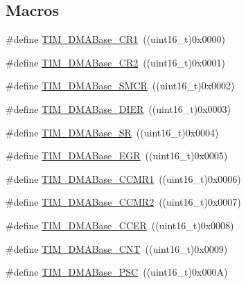 \subsection*{Macros}
\begin{DoxyCompactItemize}
\item 
\#define \hyperlink{group___t_i_m___d_m_a___base__address_ga73bca5b14da2d5026fa3877d0db53740}{T\+I\+M\+\_\+\+D\+M\+A\+Base\+\_\+\+C\+R1}~((uint16\+\_\+t)0x0000)
\item 
\#define \hyperlink{group___t_i_m___d_m_a___base__address_ga50e894f0d2cecc1ff3a3578098c3246e}{T\+I\+M\+\_\+\+D\+M\+A\+Base\+\_\+\+C\+R2}~((uint16\+\_\+t)0x0001)
\item 
\#define \hyperlink{group___t_i_m___d_m_a___base__address_ga748e24ac0675caa55869d6ba506448df}{T\+I\+M\+\_\+\+D\+M\+A\+Base\+\_\+\+S\+M\+CR}~((uint16\+\_\+t)0x0002)
\item 
\#define \hyperlink{group___t_i_m___d_m_a___base__address_gaeddacbbc2adf9705feac250f077d8c93}{T\+I\+M\+\_\+\+D\+M\+A\+Base\+\_\+\+D\+I\+ER}~((uint16\+\_\+t)0x0003)
\item 
\#define \hyperlink{group___t_i_m___d_m_a___base__address_ga5cda07a11a76bbb24a7d5bb680814d31}{T\+I\+M\+\_\+\+D\+M\+A\+Base\+\_\+\+SR}~((uint16\+\_\+t)0x0004)
\item 
\#define \hyperlink{group___t_i_m___d_m_a___base__address_gab5e6f6c3fea100896d13ce317a6ccd8e}{T\+I\+M\+\_\+\+D\+M\+A\+Base\+\_\+\+E\+GR}~((uint16\+\_\+t)0x0005)
\item 
\#define \hyperlink{group___t_i_m___d_m_a___base__address_gaab384496cff3e54d8179fc0db727c7ee}{T\+I\+M\+\_\+\+D\+M\+A\+Base\+\_\+\+C\+C\+M\+R1}~((uint16\+\_\+t)0x0006)
\item 
\#define \hyperlink{group___t_i_m___d_m_a___base__address_ga4989f74592ab359f30bd7c4a4a457571}{T\+I\+M\+\_\+\+D\+M\+A\+Base\+\_\+\+C\+C\+M\+R2}~((uint16\+\_\+t)0x0007)
\item 
\#define \hyperlink{group___t_i_m___d_m_a___base__address_ga6935639db5738662520e8d0eb7116dd6}{T\+I\+M\+\_\+\+D\+M\+A\+Base\+\_\+\+C\+C\+ER}~((uint16\+\_\+t)0x0008)
\item 
\#define \hyperlink{group___t_i_m___d_m_a___base__address_gacab604257d144cf3a59b360cbc958ec9}{T\+I\+M\+\_\+\+D\+M\+A\+Base\+\_\+\+C\+NT}~((uint16\+\_\+t)0x0009)
\item 
\#define \hyperlink{group___t_i_m___d_m_a___base__address_gab8dd06970f235fe9f6997e0975237388}{T\+I\+M\+\_\+\+D\+M\+A\+Base\+\_\+\+P\+SC}~((uint16\+\_\+t)0x000\+A)
\item 

\end{DoxyCompactItemize}
